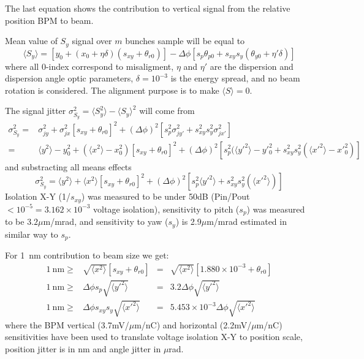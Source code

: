 The last equation shows the contribution to vertical signal from the relative position BPM to beam.\par
Mean value of $S_y$ signal over $m$ bunches sample will be equal to
\begin{equation}
 \langle S_y\rangle = [y_0+(x_0+\eta\delta)(s_{xy}+\theta_{r0})]-\Delta\phi[s_p\theta_{p0}+s_{xy}s_y(\theta_{y0}+\eta'\delta)]
\end{equation}
where all 0-index correspond to misaligment, $\eta$ and $\eta'$ are the dispersion and dispersion angle optic parameters, $\delta=10^{-3}$ is the energy spread, and no beam rotation is considered. The alignment purpose is to make $\langle S\rangle =0$.\par
The signal jitter $\sigma_{S_y}^2=\langle S_y^2\rangle-\langle S_y\rangle^2$ will come from
\begin{align*}
 \sigma_{S_y}^2=&\sigma_{jy}^2+\sigma_{jx}^2[s_{xy}+\theta_{r0}]^2+(\Delta\phi)^2[s_p^2\sigma_{jy'}^2+s_{xy}^2s_y^2\sigma_{jx'}^2]\\
 =&\langle y^2\rangle-y_0^2+(\langle x^2\rangle-x_0^2)[s_{xy}+\theta_{r0}]^2+(\Delta\phi)^2[s_p^2(\langle y'^2\rangle-y'^2_0 +s_{xy}^2s_y^2(\langle x'^2\rangle-x'^2_0)]
\end{align*}
and substracting all means effects
\begin{equation}
 \sigma_{S_y}^2=\langle y^2\rangle+\langle x^2\rangle[s_{xy}+\theta_{r0}]^2+(\Delta\phi)^2[s_p^2\langle y'^2\rangle+s_{xy}^2s_y^2(\langle x'^2\rangle)]
\end{equation}
Isolation X-Y (1/$s_{xy}$) was measured to be under 50dB (Pin/Pout$<10^{-5}=3.162\times10^{-3}$ voltage isolation), sensitivity to pitch ($s_p$) was measured to be $3.2\mu$m/mrad, and sensitivity to yaw ($s_y$) is 2.9$\mu$m/mrad estimated in similar way to $s_p$.\par
For 1~nm contribution to beam size we get:
\begin{align}
 1~\text{nm}\geq &\sqrt{\langle x^2\rangle}[s_{xy}+\theta_{r0}]&=&\sqrt{\langle x^2\rangle}[1.880\times10^{-3}+\theta_{r0}]\\
 1~\text{nm}\geq &\Delta\phi s_p\sqrt{\langle y'^2\rangle}&=& 3.2\Delta\phi\sqrt{\langle y'^2\rangle}\\
 1~\text{nm}\geq &\Delta\phi s_{xy}s_y\sqrt{\langle x'^2\rangle}&=&5.453\times10^{-3}\Delta\phi\sqrt{\langle x'^2\rangle}
\end{align}
where  the BPM vertical (3.7mV/$\mu$m/nC) and horizontal (2.2mV/$\mu$m/nC) sensitivities have been used to translate voltage isolation X-Y to position scale, position jitter is in nm and angle jitter in $\mu$rad.\par
